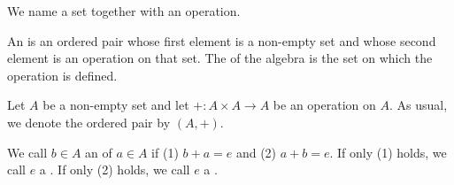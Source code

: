 
\sbasic





\sstart
{}


We name a set
together with an operation.



An  is
an ordered pair whose first
element is a non-empty set
and whose second element
is an operation on that set.
The
of the algebra is
the set on which the operation
is defined.


Let $A$ be a non-empty set and
let $+: A \times A \to A$ be
an operation on $A$.
As usual, we denote the ordered
pair by $(A, +)$.


We call $b \in A$ an 
of $a \in A$ if (1) $b + a = e$ and (2) $a + b = e$.
If only (1) holds, we call $e$ a
.
If only (2) holds, we call $e$ a
.

\strats

